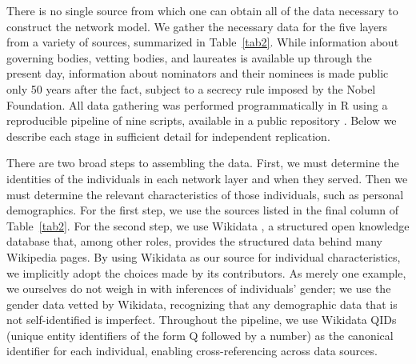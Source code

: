 \documentclass[11pt]{article}
\begin{document}
There is no single source from which one can obtain all of the data necessary to construct the network model. We gather the necessary data for the five layers from a variety of sources, summarized in Table~\ref{tab2}. While information about governing bodies, vetting bodies, and laureates is available up through the present day, information about nominators and their nominees is made public only 50 years after the fact, subject to a secrecy rule imposed by the Nobel Foundation. All data gathering was performed programmatically in R using a reproducible pipeline of nine scripts, available in a public repository \citep{nobelgithub}. Below we describe each stage in sufficient detail for independent replication.

There are two broad steps to assembling the data. First, we must determine the identities of the individuals in each network layer and when they served. Then we must determine the relevant characteristics of those individuals, such as personal demographics. For the first step, we use the sources listed in the final column of Table~\ref{tab2}. For the second step, we use Wikidata \citep{wikidata}, a structured open knowledge database that, among other roles, provides the structured data behind many Wikipedia pages. By using Wikidata as our source for individual characteristics, we implicitly adopt the choices made by its contributors. As merely one example, we ourselves do not weigh in with inferences of individuals' gender; we use the gender data vetted by Wikidata, recognizing that any demographic data that is not self-identified is imperfect. Throughout the pipeline, we use Wikidata QIDs (unique entity identifiers of the form Q followed by a number) as the canonical identifier for each individual, enabling cross-referencing across data sources.
\end{document}

